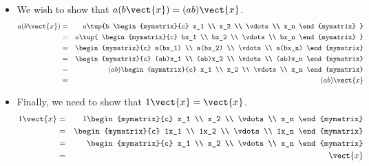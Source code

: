\begin{solution}
\begin{itemize}
\item
We wish to show that $a(b\vect{x}) = (ab) \vect{x}$. 
\begin{eqnarray*}
a(b\vect{x}) &=& 
a\tup{b \begin{mymatrix}{c}
x_1 \\
x_2 \\
\vdots \\
x_n
\end{mymatrix} } \\
&=& a\tup{
\begin{mymatrix}{c}
bx_1 \\
bx_2 \\
\vdots \\
bx_n
\end{mymatrix} } \\
&=&
\begin{mymatrix}{c}
a(bx_1) \\
a(bx_2) \\
\vdots \\
a(bx_n)
\end{mymatrix} \\
&=&
\begin{mymatrix}{c}
(ab)x_1 \\
(ab)x_2 \\
\vdots \\
(ab)x_n
\end{mymatrix} \\
&=& (ab)
\begin{mymatrix}{c}
x_1 \\
x_2 \\
\vdots \\
x_n
\end{mymatrix} \\
&=& (ab)\vect{x}
\end{eqnarray*}

\item
Finally, we need to show that $1\vect{x} = \vect{x}$.
\begin{eqnarray*}
1\vect{x} &=& 1 \begin{mymatrix}{c}
x_1 \\
x_2 \\
\vdots \\
x_n
\end{mymatrix} \\
&=&
\begin{mymatrix}{c}
1x_1 \\
1x_2 \\
\vdots \\
1x_n
\end{mymatrix} \\
&=& 
\begin{mymatrix}{c}
x_1 \\
x_2 \\
\vdots \\
x_n
\end{mymatrix} \\
&=& \vect{x}
\end{eqnarray*}
\end{itemize}


\end{solution}
